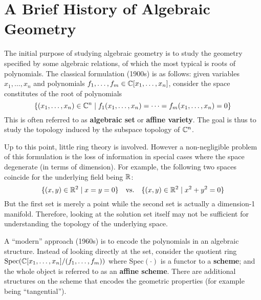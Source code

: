\documentclass{article}
\begin{document}

\tableofcontents  
\clearpage

\setcounter{section}{-1}

\section{A Brief History of Algebraic Geometry}

\textstart
The initial purpose of studying algebraic geometry is to study the geometry specified by some algebraic relations, of which the most typical is roots of polynomials. The classical formulation (1900s) is as follows: given variables $x_1, \dots, x_n$ and polynomials $f_1, \dots, f_m \in \mathbb{C}[x_1, \dots, x_n]$, consider the space constitutes of the root of polynomials
\[
    \{ (x_1, \dots, x_n) \in \mathbb{C}^n \mid f_1(x_1, \dots, x_n) = \cdots = f_m(x_1, \dots, x_n) = 0 \}
\]
This is often referred to as \textbf{algebraic set} or \textbf{affine variety}. The goal is thus to study the topology induced by the subspace topology of $\mathbb{C}^n$.

Up to this point, little ring theory is involved. However a non-negligible problem of this formulation is the loss of information in special cases where the space degenerate (in terms of dimension). For example, the following two spaces coincide for the underlying field being $\mathbb{R}$:
\[
    \{ (x, y) \in \mathbb{R}^2 \mid x = y = 0 \} 
    \quad \text{vs.} \quad
    \{ (x, y) \in \mathbb{R}^2 \mid x^2 + y^2 = 0 \}
\]
But the first set is merely a point while the second set is actually a dimension-1 manifold. Therefore, looking at the solution set itself may not be sufficient for understanding the topology of the underlying space.

A ``modern'' approach (1960s) is to encode the polynomials in an algebraic structure. Instead of looking directly at the set, consider the quotient ring $\operatorname{Spec}(\mathbb{C}[x_1, \dots, x_n]/(f_1, \dots, f_m))$ where Spec$(\cdot)$ is a functor to a \textbf{scheme}; and the whole object is referred to as an \textbf{affine scheme}. There are additional structures on the scheme that encodes the geometric properties (for example being ``tangential'').
\end{document}
